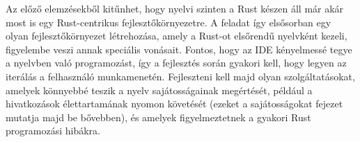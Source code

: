 Az előző elemzésekből kitűnhet, hogy nyelvi szinten a Rust készen áll már akár most is egy Rust-centrikus fejlesztőkörnyezetre. 
A feladat így elsősorban egy olyan fejlesztőkörnyezet létrehozása, amely a Rust-ot elsőrendű nyelvként kezeli, figyelembe veszi annak speciális vonásait.
Fontos, hogy az IDE kényelmessé tegye a nyelvben való programozást, így a fejlesztés során gyakori kell, hogy legyen az iterálás a felhasználó munkamenetén. 
Fejleszteni kell majd olyan szolgáltatásokat, amelyek könnyebbé teszik a nyelv sajátosságainak megértését, például a hivatkozások élettartamának nyomon követését 
(ezeket a sajátosságokat  fejezet mutatja majd be bővebben), és amelyek figyelmeztetnek a gyakori Rust programozási hibákra.



